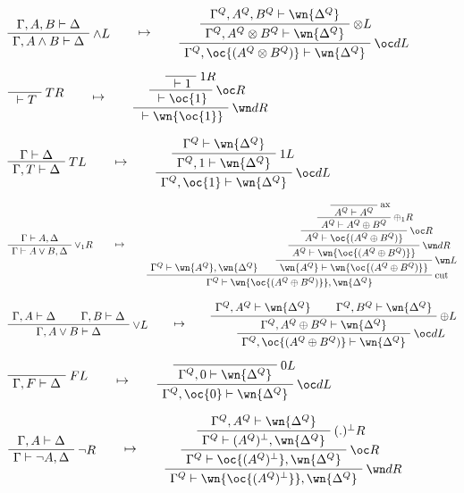 \(\AxRule{\Gamma,A,B\vdash \Delta}
\LabelRule{\wedge L}
\UnaRule{\Gamma,A\wedge B\vdash \Delta}
\DisplayProof
\qquad\mapsto\qquad
\AxRule{\Gamma^Q,A^Q,B^Q\vdash \wn{\Delta^Q}}
\LabelRule{\tens L}
\UnaRule{\Gamma^Q,A^Q\tens B^Q\vdash \wn{\Delta^Q}}
\LabelRule{\oc d L}
\UnaRule{\Gamma^Q,\oc{(A^Q\tens B^Q)}\vdash \wn{\Delta^Q}}
\DisplayProof\)

\(\LabelRule{T R}
\NulRule{{}\vdash T}
\DisplayProof
\qquad\mapsto\qquad
\LabelRule{\one R}
\NulRule{{}\vdash \one}
\LabelRule{\oc R}
\UnaRule{{}\vdash \oc{\one}}
\LabelRule{\wn d R}
\UnaRule{{}\vdash \wn{\oc{\one}}}
\DisplayProof\)

\(\AxRule{\Gamma\vdash \Delta}
\LabelRule{T L}
\UnaRule{\Gamma,T\vdash \Delta}
\DisplayProof
\qquad\mapsto\qquad
\AxRule{\Gamma^Q\vdash \wn{\Delta^Q}}
\LabelRule{\one L}
\UnaRule{\Gamma^Q,\one\vdash \wn{\Delta^Q}}
\LabelRule{\oc d L}
\UnaRule{\Gamma^Q,\oc{\one}\vdash \wn{\Delta^Q}}
\DisplayProof\)

\(\AxRule{\Gamma\vdash A,\Delta}
\LabelRule{\vee_1 R}
\UnaRule{\Gamma\vdash A\vee B,\Delta}
\DisplayProof
\qquad\mapsto\qquad
\AxRule{\Gamma^Q\vdash \wn{A^Q},\wn{\Delta^Q}}
\LabelRule{\rulename{ax}}
\NulRule{A^Q\vdash A^Q}
\LabelRule{\plus_1 R}
\UnaRule{A^Q\vdash A^Q\plus B^Q}
\LabelRule{\oc R}
\UnaRule{A^Q\vdash \oc{(A^Q\plus B^Q)}}
\LabelRule{\wn d R}
\UnaRule{A^Q\vdash \wn{\oc{(A^Q\plus B^Q)}}}
\LabelRule{\wn L}
\UnaRule{\wn{A^Q}\vdash \wn{\oc{(A^Q\plus B^Q)}}}
\LabelRule{\rulename{cut}}
\BinRule{\Gamma^Q\vdash \wn{\oc{(A^Q\plus B^Q)}},\wn{\Delta^Q}}
\DisplayProof\)

\(\AxRule{\Gamma,A\vdash \Delta}
\AxRule{\Gamma,B\vdash \Delta}
\LabelRule{\vee L}
\BinRule{\Gamma,A\vee B\vdash \Delta}
\DisplayProof
\qquad\mapsto\qquad
\AxRule{\Gamma^Q,A^Q\vdash \wn{\Delta^Q}}
\AxRule{\Gamma^Q,B^Q\vdash \wn{\Delta^Q}}
\LabelRule{\plus L}
\BinRule{\Gamma^Q,A^Q\plus B^Q\vdash \wn{\Delta^Q}}
\LabelRule{\oc d L}
\UnaRule{\Gamma^Q,\oc{(A^Q\plus B^Q)}\vdash \wn{\Delta^Q}}
\DisplayProof\)

\(\LabelRule{F L}
\NulRule{\Gamma,F\vdash \Delta}
\DisplayProof
\qquad\mapsto\qquad
\LabelRule{\zero L}
\NulRule{\Gamma^Q,\zero\vdash \wn{\Delta^Q}}
\LabelRule{\oc d L}
\UnaRule{\Gamma^Q,\oc{\zero}\vdash \wn{\Delta^Q}}
\DisplayProof\)

\(\AxRule{\Gamma,A\vdash \Delta}
\LabelRule{\neg R}
\UnaRule{\Gamma\vdash \neg A,\Delta}
\DisplayProof
\qquad\mapsto\qquad
\AxRule{\Gamma^Q,A^Q\vdash \wn{\Delta^Q}}
\LabelRule{(.)\orth R}
\UnaRule{\Gamma^Q\vdash (A^Q)\orth,\wn{\Delta^Q}}
\LabelRule{\oc R}
\UnaRule{\Gamma^Q\vdash \oc{(A^Q)\orth},\wn{\Delta^Q}}
\LabelRule{\wn d R}
\UnaRule{\Gamma^Q\vdash \wn{\oc{(A^Q)\orth}},\wn{\Delta^Q}}
\DisplayProof\)

